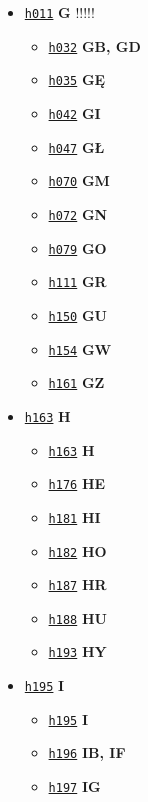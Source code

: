 \documentclass[12]{mwart}
\begin{document}
\begin{itemize}
\item \href{\paii{2}{19}}{\texttt{h011}}  \textbf{G} !!!!!
  \begin{itemize}
  \item \href{\paii{2}{40}}{\texttt{h032}}  \textbf{GB, GD}
  \item \href{\paii{2}{43}}{\texttt{h035}}  \textbf{GĘ}
  \item \href{\paii{2}{50}}{\texttt{h042}}  \textbf{GI}
  \item \href{\paii{2}{55}}{\texttt{h047}}  \textbf{GŁ}
  \item \href{\paii{2}{78}}{\texttt{h070}}  \textbf{GM}
  \item \href{\paii{2}{80}}{\texttt{h072}}  \textbf{GN}
  \item \href{\paii{2}{87}}{\texttt{h079}}  \textbf{GO}
  \item \href{\paii{2}{118}}{\texttt{h111}}  \textbf{GR}
  \item \href{\paii{2}{158}}{\texttt{h150}}  \textbf{GU}
  \item \href{\paii{2}{162}}{\texttt{h154}}  \textbf{GW}
  \item \href{\paii{2}{169}}{\texttt{h161}}  \textbf{GZ}
  \end{itemize}
\item \href{\paii{2}{171}}{\texttt{h163}}  \textbf{H}
  \begin{itemize}
  \item \href{\paii{2}{171}}{\texttt{h163}}  \textbf{H}
  \item \href{\paii{2}{184}}{\texttt{h176}}  \textbf{HE}
  \item \href{\paii{2}{189}}{\texttt{h181}}  \textbf{HI}
  \item \href{\paii{2}{190}}{\texttt{h182}}  \textbf{HO}
  \item \href{\paii{2}{195}}{\texttt{h187}}  \textbf{HR}
  \item \href{\paii{2}{196}}{\texttt{h188}}  \textbf{HU}
  \item \href{\paii{2}{201}}{\texttt{h193}}  \textbf{HY}
  \end{itemize}
\item \href{\paii{2}{203}}{\texttt{h195}}  \textbf{I}
  \begin{itemize}
  \item \href{\paii{2}{203}}{\texttt{h195}}  \textbf{I}
  \item \href{\paii{2}{204}}{\texttt{h196}}  \textbf{IB, IF}
  \item \href{\paii{2}{205}}{\texttt{h197}}  \textbf{IG}

\end{itemize}
\end{itemize}
\end{document}
